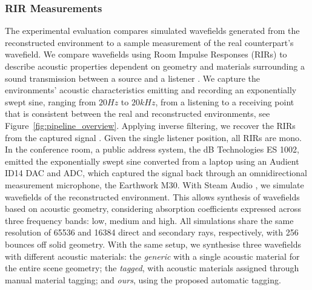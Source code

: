\subsubsection{RIR Measurements}
The experimental evaluation compares simulated wavefields generated from the reconstructed environment to a sample measurement of the real counterpart's wavefield. We compare wavefields using Room Impulse Responses (RIRs) to describe acoustic properties dependent on geometry and materials surrounding a sound transmission between a source and a listener \cite{stan2002comparison}. We capture the environments' acoustic characteristics emitting and recording an exponentially swept sine, ranging from $20Hz$ to $20kHz$, from a listening to a receiving point that is consistent between the real and reconstructed environments, see Figure~\ref{fig:pipeline_overview}. Applying inverse filtering, we recover the RIRs from the captured signal \cite{holters2009impulse}. Given the single listener position, all RIRs are mono.
In the conference room, a public address system, the dB Technologies ES 1002, emitted the exponentially swept sine converted from a laptop using an Audient ID14 DAC and ADC, which captured the signal back through an omnidirectional measurement microphone, the Earthwork M30.
With Steam Audio \cite{audio2019git}, we simulate wavefields of the reconstructed environment.  This allows synthesis of wavefields based on acoustic geometry, considering absorption coefficients expressed across three frequency bands: low, medium and high. All simulations share the same resolution of 65536 and 16384 direct and secondary rays, respectively, with 256 bounces off solid geometry. With the same setup, we synthesise three wavefields with different acoustic materials: the \emph{generic} with a single acoustic material for the entire scene geometry; the \emph{tagged}, with acoustic materials assigned through manual material tagging; and \emph{ours}, using the proposed automatic tagging.
